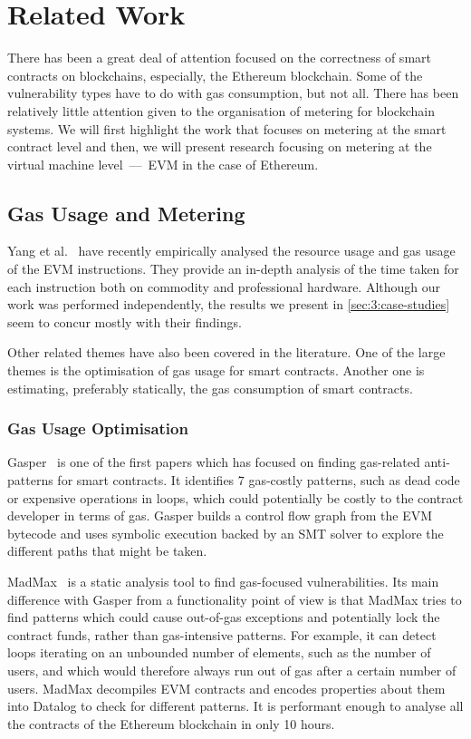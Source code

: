 \section{Related Work}
\label{sec:3:related}

There has been a great deal of attention focused on the correctness of smart contracts on blockchains, especially, the Ethereum blockchain. Some of the vulnerability types have to do with gas consumption, but not all. There has been relatively little attention given to the organisation of metering for blockchain systems. We will first highlight the work that focuses on metering at the smart contract level and then, we will present research focusing on metering at the virtual machine level~---~EVM in the case of Ethereum.

\subsection{Gas Usage and Metering}
Yang et al.~\cite{DBLP:journals/corr/abs-1905-00553} have recently empirically analysed the resource usage and gas usage of the EVM instructions.
They provide an in-depth analysis of the time taken for each instruction both on commodity and professional hardware. Although our work was performed independently, the results we present in \autoref{sec:3:case-studies} seem to concur mostly with their findings.

Other related themes have also been covered in the literature. One of the large themes is the optimisation of gas usage for smart contracts. Another one is estimating, preferably statically, the gas consumption of smart contracts.

\subsubsection*{Gas Usage Optimisation}
Gasper~\cite{Chen2017} is one of the first papers which has focused on finding gas-related anti-patterns for smart contracts. It identifies 7 gas-costly patterns, such as dead code or expensive operations in loops, which could potentially be costly to the contract developer in terms of gas. Gasper builds a control flow graph from the EVM bytecode and uses symbolic execution backed by an SMT solver to explore the different paths that might be taken.

MadMax~\cite{Grech2018} is a static analysis tool to find gas-focused vulnerabilities. Its main difference with Gasper from a functionality point of view is that MadMax tries to find patterns which could cause out-of-gas exceptions and potentially lock the contract funds, rather than gas-intensive patterns. For example, it can detect loops iterating on an unbounded number of elements, such as the number of users, and which would therefore always run out of gas after a certain number of users. MadMax decompiles EVM contracts and encodes properties about them into Datalog to check for different patterns. It is performant enough to analyse all the contracts of the Ethereum blockchain in only 10 hours.

